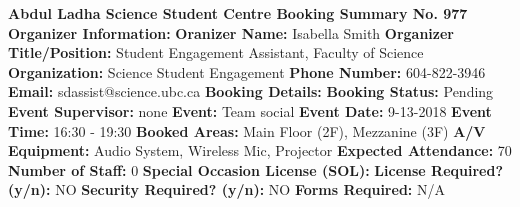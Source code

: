 \documentclass{article}%
\begin{document}
%
\textbf{ }%
\newline%
\textbf{Abdul Ladha Science Student Centre Booking Summary No. 977}%
\newline%
\newline%
\textbf{Organizer Information:}%
\newline%
\textbf{Oranizer Name: }%
Isabella Smith%
\newline%
\textbf{Organizer Title/Position: }%
Student Engagement Assistant, Faculty of Science%
\newline%
\textbf{Organization: }%
Science Student Engagement%
\newline%
\textbf{Phone Number: }%
604{-}822{-}3946%
\newline%
\textbf{Email: }%
sdassist@science.ubc.ca%
\newline%
\newline%
\textbf{Booking Details: }%
\newline%
\textbf{Booking Status: }%
Pending%
\newline%
\textbf{Event Supervisor: }%
none%
\newline%
\textbf{Event: }%
Team social%
\newline%
\textbf{Event Date: }%
9{-}13{-}2018%
\newline%
\textbf{Event Time: }%
16:30 {-} 19:30%
\newline%
\textbf{Booked Areas: }%
Main Floor (2F), Mezzanine (3F)%
\newline%
\textbf{A/V Equipment: }%
Audio System, Wireless Mic, Projector%
\newline%
\textbf{Expected Attendance: }%
70%
\newline%
\textbf{Number of Staff: }%
0%
\newline%
\newline%
\textbf{Special Occasion License (SOL): }%
\newline%
\textbf{License Required? (y/n): }%
NO%
\newline%
\textbf{Security Required? (y/n): }%
NO%
\newline%
\textbf{Forms Required: }%
N/A%
\newline%
\end{document}
